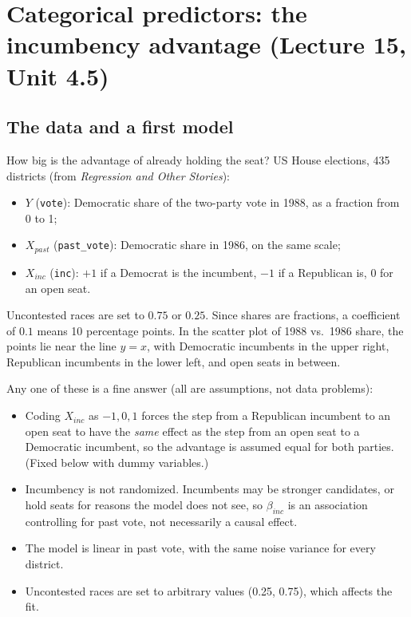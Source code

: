 \documentclass[11pt]{article}
\newcommand{\py}[1]{\texttt{#1}}
\begin{document}
\section{Categorical predictors: the incumbency advantage (Lecture 15, Unit 4.5)}\label{sec:cat}
\subsection{The data and a first model}
How big is the advantage of already holding the seat? US House elections, 435 districts (from \emph{Regression and Other Stories}):
\begin{itemize}[leftmargin=*,itemsep=2pt]
\item $Y$ (\py{vote}): Democratic share of the two-party vote in 1988, as a fraction from 0 to 1;
\item $X_{past}$ (\py{past\_vote}): Democratic share in 1986, on the same scale;
\item $X_{inc}$ (\py{inc}): $+1$ if a Democrat is the incumbent, $-1$ if a Republican is, $0$ for an open seat.
\end{itemize}
Uncontested races are set to $0.75$ or $0.25$. Since shares are fractions, a coefficient of $0.1$ means 10 percentage points. In the scatter
plot of 1988 vs.\ 1986 share, the points lie near the line $y=x$, with Democratic incumbents in the upper right, Republican incumbents in the
lower left, and open seats in between.

\begin{examplebox}[title={Question (10/19): a limitation of the model $Y=\beta_0+\beta_{past}X_{past}+\beta_{inc}X_{inc}+\epsilon$}]
Any one of these is a fine answer (all are assumptions, not data problems):
\begin{itemize}[leftmargin=*,itemsep=1pt]
\item Coding $X_{inc}$ as $-1,0,1$ forces the step from a Republican incumbent to an open seat to have the \emph{same} effect as the step from
an open seat to a Democratic incumbent, so the advantage is assumed equal for both parties. (Fixed below with dummy variables.)
\item Incumbency is not randomized. Incumbents may be stronger candidates, or hold seats for reasons the model does not see, so $\beta_{inc}$
is an association controlling for past vote, not necessarily a causal effect.
\item The model is linear in past vote, with the same noise variance for every district.
\item Uncontested races are set to arbitrary values (0.25, 0.75), which affects the fit.
\end{itemize}
\end{examplebox}
\end{document}

